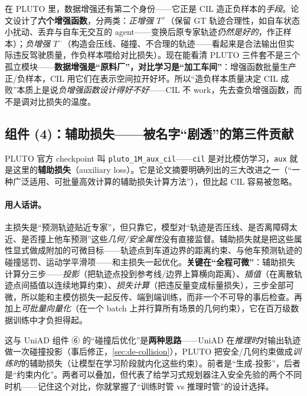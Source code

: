 \begin{insight}
在 PLUTO 里，数据增强还有第二个身份——它正是 CIL 造正负样本的\emph{手段}。论文设计了\textbf{六个增强函数}，分两类：\emph{正增强 $T^+$}（保留 GT 轨迹合理性，如自车状态小扰动、丢弃与自车无交互的 agent——变换后原专家轨迹\emph{仍然是好的}，作正样本）；\emph{负增强 $T^-$}（构造会压线、碰撞、不合理的轨迹——看起来是合法输出但实际违反驾驶质量，作负样本喂给对比损失）。现在能看清 PLUTO 三件套不是三个孤立模块——\textbf{数据增强是“原料厂”，对比学习是“加工车间”}：增强函数批量生产正/负样本，CIL 用它们在表示空间拉开好坏。所以“造负样本质量决定 CIL 成败”本质上是说\emph{负增强函数设计得好不好}——CIL 不 work，先去查负增强函数，而不是调对比损失的温度。
\end{insight}

\subsection{组件 (4)：辅助损失——被名字“剧透”的第三件贡献}
\label{sec:de-aux}

PLUTO 官方 checkpoint 叫 \texttt{pluto\_1M\_aux\_cil}——\texttt{cil} 是对比模仿学习，\texttt{aux} 就是这里的\textbf{辅助损失}（auxiliary loss）。它是论文摘要明确列出的三大改进之一（“一种广泛适用、可批量高效计算的辅助损失计算方法”），但比起 CIL 容易被忽略。

\paragraph{用人话讲。}
主损失是“预测轨迹贴近专家”，但只靠它，模型对“轨迹是否压线、是否离障碍太近、是否撞上他车预测”这些\emph{几何/安全属性}没有直接监督。辅助损失就是把这些属性显式做成附加的可微目标——轨迹点到车道边界的距离约束、与他车预测轨迹的碰撞惩罚、运动学平滑项——和主损失一起优化。\textbf{关键在“全程可微”}：辅助损失计算分三步——\emph{投影}（把轨迹点投到参考线/边界上算横向距离）、\emph{插值}（在离散轨迹点间插值以连续地算约束）、\emph{损失计算}（把违反量变成标量损失），三步全部可微，所以能和主模仿损失一起反传、端到端训练，而非一个不可导的事后检查。再加上\emph{可批量向量化}（在一个 batch 上并行算所有场景的几何约束），它在百万级数据训练中才负担得起。

\begin{insight}
这与 UniAD 组件 ⑥ 的“碰撞后优化”是\textbf{两种思路}——UniAD 在\emph{推理时}对输出轨迹做一次碰撞投影（事后修正，\cref{sec:de-collision}），PLUTO 把安全/几何约束做成\emph{训练时}的辅助损失（让模型在学习阶段就内化这些约束）。前者是“生成-投影”，后者是“约束内化”。两者可以叠加，但代表了给学习式规划器注入安全先验的两个不同时机——记住这个对比，你就掌握了“训练时管 vs 推理时管”的设计选择。
\end{insight}

